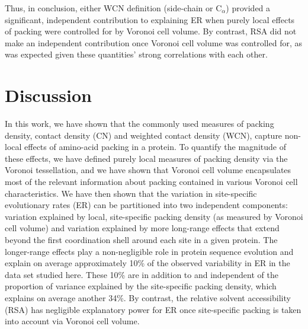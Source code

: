 \documentclass[12pt]{article}
\begin{document}
Thus, in conclusion, either WCN definition (side-chain or C$_\alpha$) provided a significant, independent contribution to explaining ER when purely local effects of packing were controlled for by Voronoi cell volume. By contrast, RSA did not make an independent contribution once Voronoi cell volume was controlled for, as was expected given these quantities' strong correlations with each other.


\section*{Discussion}

In this work, we have shown that the commonly used measures of packing density, contact density (CN) and weighted contact density (WCN), capture non-local effects of amino-acid packing in a protein. To quantify the magnitude of these effects, we have defined purely local measures of packing density via the Voronoi tessellation, and we have shown that Voronoi cell volume encapsulates most of the relevant information about packing contained in various Voronoi cell characteristics. We have then shown that the variation in site-specific evolutionary rates (ER) can be partitioned into two independent components: variation explained by local, site-specific packing density (as measured by Voronoi cell volume) and variation explained by more long-range effects that extend beyond the first coordination shell around each site in a given protein. The longer-range effects play a non-negligible role in protein sequence evolution and explain on average approximately 10\% of the observed variability in ER in the data set studied here. These 10\% are in addition to and independent of the proportion of variance explained by the site-specific packing density, which explains on average another 34\%. By contrast, the relative solvent accessibility (RSA) has negligible explanatory power for ER once site-specific packing is taken into account via Voronoi cell volume.
\end{document}
